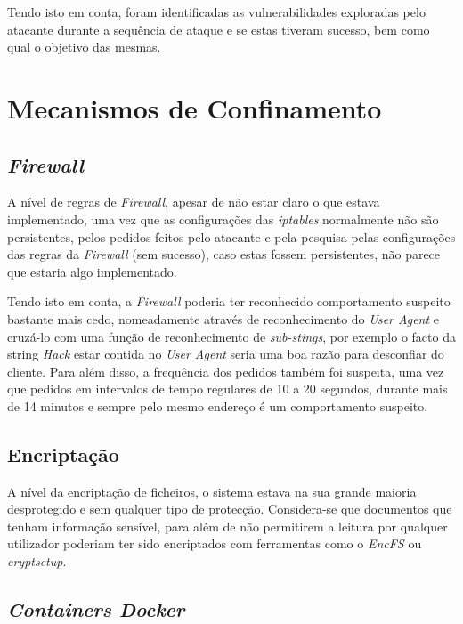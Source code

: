 \documentclass[10pt,english]{article}
\begin{document}
\par Tendo isto em conta, foram identificadas as vulnerabilidades exploradas pelo atacante durante a sequência de ataque e se estas tiveram sucesso, bem como qual o objetivo das mesmas. 
\clearpage

\clearpage

\section{Mecanismos de Confinamento}

\subsection{\textit{Firewall}}
\par A nível de regras de \textit{Firewall}, apesar de não estar claro o que estava implementado, uma vez que as configurações das \textit{iptables} normalmente não são persistentes, pelos pedidos feitos pelo atacante e pela pesquisa pelas configurações das regras da \textit{Firewall} (sem sucesso), caso estas fossem persistentes, não parece que estaria algo implementado.

\par Tendo isto em conta, a \textit{Firewall} poderia ter reconhecido comportamento suspeito bastante mais cedo, nomeadamente através de reconhecimento do \textit{User Agent} e cruzá-lo com uma função de reconhecimento de \textit{sub-stings}, por exemplo o facto da string \textit{Hack} estar contida no \textit{User Agent} seria uma boa razão para desconfiar do cliente. Para além disso, a frequência dos pedidos também foi suspeita, uma vez que pedidos em intervalos de tempo regulares de 10 a 20 segundos, durante mais de 14 minutos e sempre pelo mesmo endereço é um comportamento suspeito.

\subsection{Encriptação}
\par A nível da encriptação de ficheiros, o sistema estava na sua grande maioria desprotegido e sem qualquer tipo de protecção. Considera-se que documentos que tenham informação sensível, para além de não permitirem a leitura por qualquer utilizador poderiam ter sido encriptados com ferramentas como o \textit{EncFS} ou \textit{cryptsetup}.

\subsection{\textit{Containers Docker}}
\end{document}
